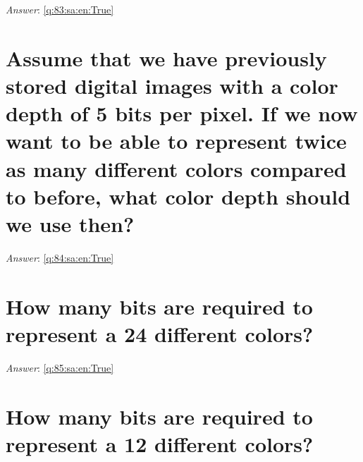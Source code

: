 \documentclass[a4paper,11pt,oneside]{book}
\begin{document}
\begin{sloppypar}
\label{q:83:sa:en:False}

\vspace{2cm}

\noindent\makebox[\textwidth]{\hrulefill}

\vspace{1cm}

\textit{Answer}: \autoref{q:83:sa:en:True}



\section{Assume that we have previously stored digital images with a color depth of 5 bits per pixel. If we now want to be able to represent twice as many different colors compared to before, what color depth should we use then?}

\label{q:84:sa:en:False}

\vspace{2cm}

\noindent\makebox[\textwidth]{\hrulefill}

\vspace{1cm}

\textit{Answer}: \autoref{q:84:sa:en:True}



\section{How many bits are required to represent a 24 different colors?}

\label{q:85:sa:en:False}

\vspace{2cm}

\noindent\makebox[\textwidth]{\hrulefill}

\vspace{1cm}

\textit{Answer}: \autoref{q:85:sa:en:True}



\section{How many bits are required to represent a 12 different colors?}

\label{q:86:sa:en:False}

\vspace{2cm}

\noindent\makebox[\textwidth]{\hrulefill}


\end{sloppypar}
\end{document}
